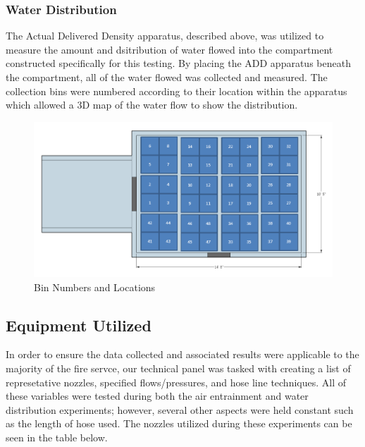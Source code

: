 \documentclass{article}
\begin{document}
\subsubsection{Water Distribution}

The Actual Delivered Density apparatus, described above, was utilized to measure the amount and dsitribution of water flowed into the compartment constructed specifically for this testing. By placing the ADD apparatus beneath the compartment, all of the water flowed was collected and measured. The collection bins were numbered according to their location within the apparatus which allowed a 3D map of the water flow to show the distribution.

\begin{figure}[!ht]
	\centering
	\includegraphics[width=6in]{Figures/Water_Distribution/Measurement_Locations_BinNumbers.png}
	\caption{Bin Numbers and Locations}
	\label{fig:Bin Numbers and Locations}
\end{figure}

\clearpage

\subsection{Equipment Utilized}

In order to ensure the data collected and associated results were applicable to the majority of the fire servce, our technical panel was tasked with creating a list of represetative nozzles, specified flows/pressures, and hose line techniques. All of these variables were tested during both the air entrainment and water distribution experiments; however, several other aspects were held constant such as the length of hose used. The nozzles utilized during these experiments can be seen in the table below.
\end{document}
